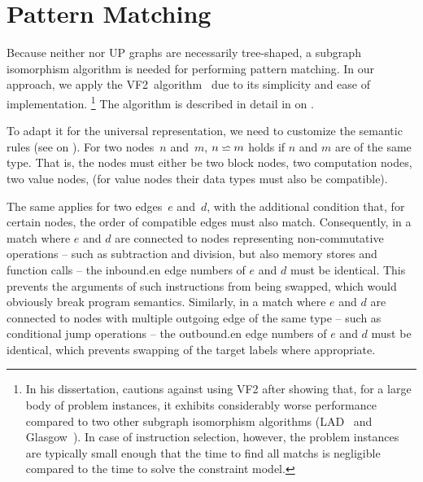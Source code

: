 \section{Pattern Matching}

Because neither  nor \glspl{UP graph} are necessarily
tree-shaped, a \gls{subgraph isomorphism} algorithm is needed for performing
\gls{pattern matching}.
%
In our approach, we apply the \gls{VF2}~algorithm~\cite{CordellaEtAl:2001} due
to its simplicity and ease of implementation.\!%
%
\footnote{%
  In his dissertation, \textcite{McCreesh:2017} cautions against using \gls{VF2}
  after showing that, for a large body of problem instances, it exhibits
  considerably worse performance compared to two other \gls{subgraph
    isomorphism} algorithms (\gls{LAD}~\cite{Solnon:2010} and
  \gls{Glasgow}~\cite{McCreeshProsser:2015}).
  In case of \gls{instruction selection}, however, the problem instances are
  typically small enough that the time to find all \glspl{match} is negligible
  compared to the time to solve the \gls{constraint model}.
}
%
The algorithm is described in detail in
 on
.

To adapt it for the \gls{universal representation}, we need to customize the
semantic rules (see  on
).
%
For two \glspl{node}~$n$ and~$m$, \mbox{$n \backsimeq m$} holds if $n$ and
$m$ are of the same type.
%
That is, the \glspl{node} must either be two \glspl{block node}, two
\glspl{computation node}, two \glspl{value node}, \etc (for \glspl{value node}
their data types must also be compatible).

The same applies for two \glspl{edge}~$e$ and~$d$, with the additional condition
that, for certain \glspl{node}, the order of compatible \glspl{edge} must also
match.
%
Consequently, in a \gls{match} where $e$ and $d$ are connected to \glspl{node}
representing non-commutative \glspl{operation} -- such as subtraction and
division, but also memory stores and function calls -- the \gls{inbound.en}
\glspl{edge number} of $e$ and $d$ must be identical.
%
This prevents the arguments of such \glspl{instruction} from being swapped,
which would obviously break \gls{program} semantics.
%
Similarly, in a \gls{match} where $e$ and $d$ are connected to \glspl{node} with
multiple outgoing \gls{edge} of the same type -- such as conditional jump
\glspl{operation} -- the \gls{outbound.en} \glspl{edge number} of $e$ and $d$
must be identical, which prevents swapping of the target labels where
appropriate.


